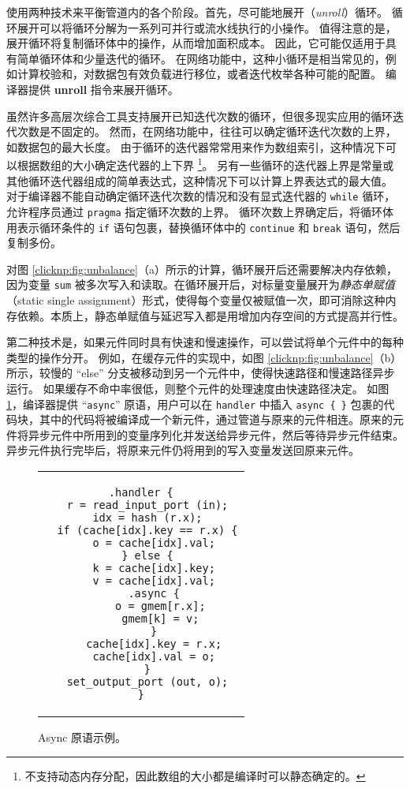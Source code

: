 \name 使用两种技术来平衡管道内的各个阶段。首先，尽可能地展开（\textit {unroll}）循环。
循环展开可以将循环分解为一系列可并行或流水线执行的小操作。
值得注意的是，展开循环将复制循环体中的操作，从而增加面积成本。
因此，它可能仅适用于具有简单循环体和少量迭代的循环。
在网络功能中，这种小循环是相当常见的，例如计算校验和，对数据包有效负载进行移位，或者迭代枚举各种可能的配置。
\name{} 编译器提供 \textbf {unroll} 指令来展开循环。

虽然许多高层次综合工具支持展开已知迭代次数的循环，但很多现实应用的循环迭代次数是不固定的。
然而，在网络功能中，往往可以确定循环迭代次数的上界，如数据包的最大长度。
由于循环的迭代器常常用来作为数组索引，这种情况下可以根据数组的大小确定迭代器的上下界 \footnote{\name{} 不支持动态内存分配，因此数组的大小都是编译时可以静态确定的。}。
另有一些循环的迭代器上界是常量或其他循环迭代器组成的简单表达式，这种情况下可以计算上界表达式的最大值。
对于编译器不能自动确定循环迭代次数的情况和没有显式迭代器的 \texttt{while} 循环，\name 允许程序员通过 \texttt{pragma} 指定循环次数的上界。
循环次数上界确定后，\name 将循环体用表示循环条件的 \texttt{if} 语句包裹，替换循环体中的 \texttt{continue} 和 \texttt{break} 语句，然后复制多份。

对图 \ref {clicknp:fig:unbalance}（a）所示的计算，循环展开后还需要解决内存依赖，因为变量 \texttt{sum} 被多次写入和读取。\name 在循环展开后，对标量变量展开为\emph{静态单赋值}（static single assignment）形式，使得每个变量仅被赋值一次，即可消除这种内存依赖。本质上，静态单赋值与延迟写入都是用增加内存空间的方式提高并行性。



第二种技术是，如果元件同时具有快速和慢速操作，可以尝试将单个元件中的每种类型的操作分开。
例如，在缓存元件的实现中，如图 \ref {clicknp:fig:unbalance}（b）所示，较慢的 ``else'' 分支被移动到另一个元件中，使得快速路径和慢速路径异步运行。
如果缓存不命中率很低，则整个元件的处理速度由快速路径决定。
如图 \ref{clicknp:fig:async}，\name 编译器提供 ``\texttt{async}'' 原语，用户可以在 \texttt{handler} 中插入 \texttt{async \{ \}} 包裹的代码块，其中的代码将被编译成一个新元件，通过管道与原来的元件相连。原来的元件将异步元件中所用到的变量序列化并发送给异步元件，然后等待异步元件结束。异步元件执行完毕后，将原来元件仍将用到的写入变量发送回原来元件。



\begin{figure}[htbp]
	\small
	\centering
	\begin{tabular}{c}
\begin{lstlisting}
.handler {
  r = read_input_port (in);
  idx = hash (r.x);
  if (cache[idx].key == r.x) {
    o = cache[idx].val;
  } else {
    k = cache[idx].key;
    v = cache[idx].val;
    .async {
      o = gmem[r.x];
      gmem[k] = v;
    }
    cache[idx].key = r.x;
    cache[idx].val = o;
  }
  set_output_port (out, o);
}
\end{lstlisting}
	\end{tabular}
	\caption{Async 原语示例。}
	\label{clicknp:fig:async}
\end{figure}


